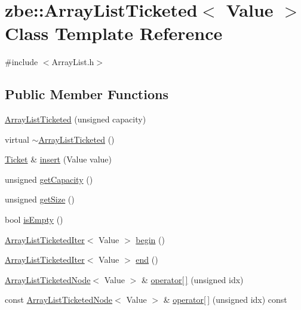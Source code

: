 \hypertarget{classzbe_1_1_array_list_ticketed}{}\section{zbe\+:\+:Array\+List\+Ticketed$<$ Value $>$ Class Template Reference}
\label{classzbe_1_1_array_list_ticketed}


{\ttfamily \#include $<$Array\+List.\+h$>$}

\subsection*{Public Member Functions}
\begin{DoxyCompactItemize}
\item 
\hyperlink{classzbe_1_1_array_list_ticketed_afff5d9befd97a0d129ba81a5c2f182fa}{Array\+List\+Ticketed} (unsigned capacity)
\item 
virtual \hyperlink{classzbe_1_1_array_list_ticketed_a1224fa84d15f3ecb76b2a445fd00a397}{$\sim$\+Array\+List\+Ticketed} ()
\item 
\hyperlink{classzbe_1_1_ticket}{Ticket} \& \hyperlink{classzbe_1_1_array_list_ticketed_a163e622f9ff8e9212237edd5069b0cf7}{insert} (Value value)
\item 
unsigned \hyperlink{classzbe_1_1_array_list_ticketed_ae364fce45b2e1ac2c0d88cdba6550bc3}{get\+Capacity} ()
\item 
unsigned \hyperlink{classzbe_1_1_array_list_ticketed_adfaa36ca3a1324289f3c62b89b8cbebb}{get\+Size} ()
\item 
bool \hyperlink{classzbe_1_1_array_list_ticketed_aa602a202649a4fd159b64a6598aa2187}{is\+Empty} ()
\item 
\hyperlink{classzbe_1_1_array_list_ticketed_iter}{Array\+List\+Ticketed\+Iter}$<$ Value $>$ \hyperlink{classzbe_1_1_array_list_ticketed_a580db1c605df628c8c87c936d6c18e43}{begin} ()
\item 
\hyperlink{classzbe_1_1_array_list_ticketed_iter}{Array\+List\+Ticketed\+Iter}$<$ Value $>$ \hyperlink{classzbe_1_1_array_list_ticketed_a5033c9e9335b4518604be7e3bb5a95ac}{end} ()
\item 
\hyperlink{structzbe_1_1_array_list_ticketed_node}{Array\+List\+Ticketed\+Node}$<$ Value $>$ \& \hyperlink{classzbe_1_1_array_list_ticketed_a6a4bb7e7e487d8bf85523aacfca64291}{operator\mbox{[}$\,$\mbox{]}} (unsigned idx)
\item 
const \hyperlink{structzbe_1_1_array_list_ticketed_node}{Array\+List\+Ticketed\+Node}$<$ Value $>$ \& \hyperlink{classzbe_1_1_array_list_ticketed_ad61ad37401c3727a026432e00c90b480}{operator\mbox{[}$\,$\mbox{]}} (unsigned idx) const 
\end{DoxyCompactItemize}
